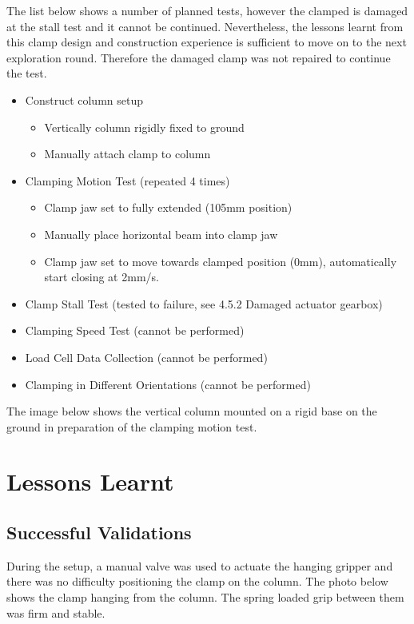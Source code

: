 The list below shows a number of planned tests, however the clamped is damaged at the stall test and it cannot be continued. Nevertheless, the lessons learnt from this clamp design and construction experience is sufficient to move on to the next exploration round. Therefore the damaged clamp was not repaired to continue the test.
\begin{itemize}
    \item Construct column setup
    \begin{itemize}
        \item Vertically column rigidly fixed to ground
        \item Manually attach clamp to column
    \end{itemize}
    \item Clamping Motion Test (repeated 4 times)
    \begin{itemize}
        \item Clamp jaw set to fully extended (105mm position)
        \item Manually place horizontal beam into clamp jaw 
        \item Clamp jaw set to move towards clamped position (0mm), automatically start closing at 2mm/s.
    \end{itemize}
    \item Clamp Stall Test (tested to failure, see 4.5.2 Damaged actuator gearbox)
    \item Clamping Speed Test (cannot be performed)
    \item Load Cell Data Collection (cannot be performed)
    \item Clamping in Different Orientations (cannot be performed)
\end{itemize}

    The image below shows the vertical column mounted on a rigid base on the ground in preparation of the clamping motion test.

\section{Lessons Learnt}
\label{section:exploration-1-lessions-learnt}

\subsection{Successful Validations}
\label{subsection:exploration-1-successful-validations}

During the setup, a manual valve was used to actuate the hanging gripper and there was no difficulty positioning the clamp on the column. The photo below shows the clamp hanging from the column. The spring loaded grip between them was firm and stable. 

